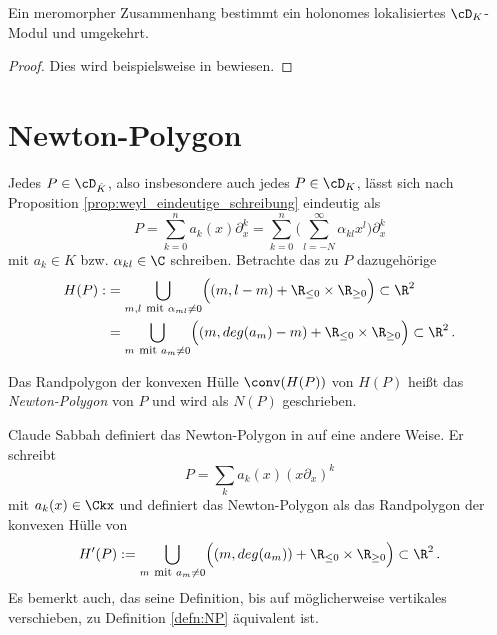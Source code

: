 \begin{thm}
Ein meromorpher Zusammenhang bestimmt ein holonomes lokalisiertes
$\cD_K$-Modul und umgekehrt.
\end{thm}
\begin{proof}
Dies wird beispielsweise in \cite[Thm 4.3.2]{sabbah_cimpa90} bewiesen.
\end{proof}

\section{Newton-Polygon} \label{sec:NewtonPolygon}
Jedes $P\in \cD_{\hat K}$, also insbesondere auch jedes $P\in\cD_K$, lässt sich
nach Proposition \ref{prop:weyl_eindeutige_schreibung} eindeutig als
\[
P=\sum^{n}_{k=0}a_k(x)\partial_x^k
=\sum^{n}_{k=0}\big(\sum^{\infty}_{l=-N}{\alpha_{kl}x^l\big)\partial_x^k} 
\]
mit $a_k\in \hat K$ bzw. $\alpha_{kl}\in\C$ schreiben. Betrachte das zu $P$
dazugehörige
\begin{align*}
H(P):&=\underset{m,l\mbox{ \footnotesize mit }\alpha_{ml}\neq0}{\bigcup}
  \Big( (m,l-m) + \R_{\leq 0}\times \R_{\geq 0} \Big) \subset \R^2\\
  &=\underset{m\mbox{ \footnotesize mit }a_{m}\neq0}{\bigcup}
  \Big( (m,deg(a_m)-m) + \R_{\leq 0}\times \R_{\geq 0} \Big) \subset \R^2 \,.
\end{align*}

\begin{defn} \label{defn:NP}
Das Randpolygon der konvexen Hülle $\conv(H(P))$ von $H(P)$ heißt das
\emph{Newton-Polygon} von $P$ und wird als $N(P)$ geschrieben.
\end{defn}

\begin{bem}
Claude Sabbah definiert das Newton-Polygon in \cite[5.1]{sabbah_cimpa90}
auf eine andere Weise. Er schreibt
\[
P=\sum_ka_k(x)(x\partial_x)^k
\]
mit $a_k(x)\in \Ckx$ und definiert das Newton-Polygon als das
Randpolygon der konvexen Hülle von
\[
H'(P):=\underset{m\mbox{ \footnotesize mit }a_{m}\neq0}{\bigcup}
  \Big( (m,deg(a_m)) + \R_{\leq 0}\times \R_{\geq 0} \Big) \subset \R^2 \,.
\]
Es bemerkt auch, das seine Definition, bis auf möglicherweise vertikales
verschieben, zu Definition \ref{defn:NP} äquivalent ist.
\end{bem}

